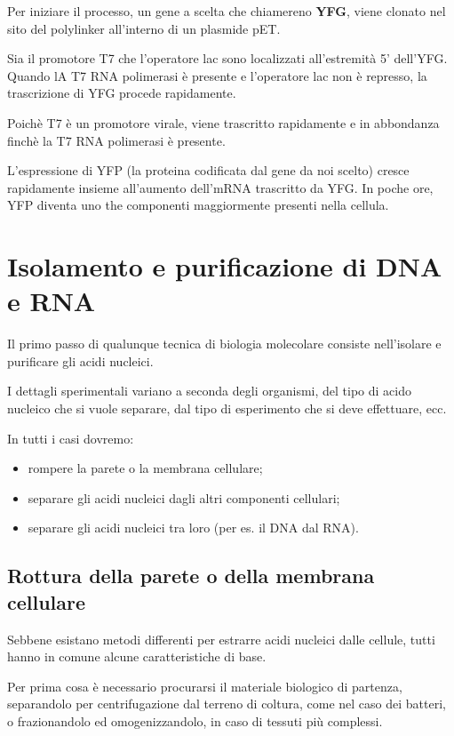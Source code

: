 \documentclass[]{article}
\begin{document}
Per iniziare il processo, un gene a scelta che chiamereno \textbf{YFG},
viene clonato nel sito del polylinker all'interno di un plasmide pET.

Sia il promotore T7 che l'operatore lac sono localizzati all'estremità
5' dell'YFG. Quando lA T7 RNA polimerasi è presente e l'operatore lac
non è represso, la trascrizione di YFG procede rapidamente.

Poichè T7 è un promotore virale, viene trascritto rapidamente e in
abbondanza finchè la T7 RNA polimerasi è presente.

L'espressione di YFP (la proteina codificata dal gene da noi scelto)
cresce rapidamente insieme all'aumento dell'mRNA trascritto da YFG. In
poche ore, YFP diventa uno the componenti maggiormente presenti nella
cellula.

\section{Isolamento e purificazione di DNA e
RNA}\label{isolamento-e-purificazione-di-dna-e-rna}

Il primo passo di qualunque tecnica di biologia molecolare consiste
nell'isolare e purificare gli acidi nucleici.

I dettagli sperimentali variano a seconda degli organismi, del tipo di
acido nucleico che si vuole separare, dal tipo di esperimento che si
deve effettuare, ecc.

In tutti i casi dovremo:

\begin{itemize}
\itemsep1pt\parskip0pt
\item
  rompere la parete o la membrana cellulare;
\item
  separare gli acidi nucleici dagli altri componenti cellulari;
\item
  separare gli acidi nucleici tra loro (per es. il DNA dal RNA).
\end{itemize}

\subsection{Rottura della parete o della membrana
cellulare}\label{rottura-della-parete-o-della-membrana-cellulare}

Sebbene esistano metodi differenti per estrarre acidi nucleici dalle
cellule, tutti hanno in comune alcune caratteristiche di base.

Per prima cosa è necessario procurarsi il materiale biologico di
partenza, separandolo per centrifugazione dal terreno di coltura, come
nel caso dei batteri, o frazionandolo ed omogenizzandolo, in caso di
tessuti più complessi.
\end{document}
